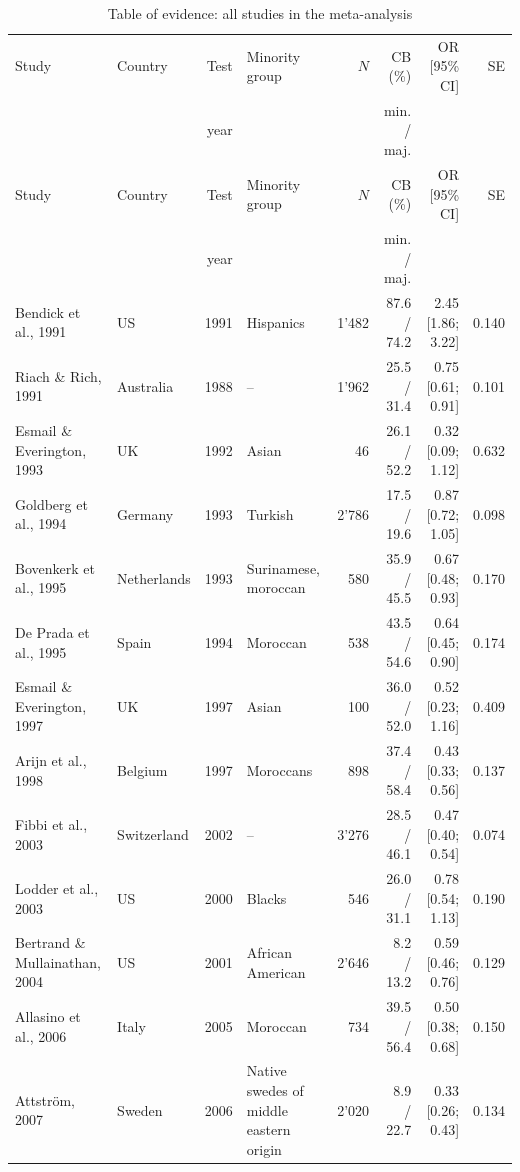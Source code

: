 {\scriptsize
\setlength{\tabcolsep}{3pt}
\begin{longtable}{>{\raggedright\arraybackslash}p{3.4cm}lr>{\raggedright\arraybackslash}p{3.2cm}rrrr}
\caption{Table of evidence: all studies in the meta-analysis}\label{tab:evidence}\\
\toprule
Study & Country & Test & Minority group & $N$ & CB (\%) & OR [95\% CI] & SE \\
 & & year & & & min. / maj. & & \\
\midrule\endfirsthead
\toprule
Study & Country & Test & Minority group & $N$ & CB (\%) & OR [95\% CI] & SE \\
 & & year & & & min. / maj. & & \\
\midrule\endhead
\bottomrule\endfoot
Bendick et al., 1991 & US & 1991 & Hispanics & 1'482 & 87.6 / 74.2 & 2.45 [1.86; 3.22] & 0.140 \\
Riach \& Rich, 1991 & Australia & 1988 & -- & 1'962 & 25.5 / 31.4 & 0.75 [0.61; 0.91] & 0.101 \\
Esmail \& Everington, 1993 & UK & 1992 & Asian & 46 & 26.1 / 52.2 & 0.32 [0.09; 1.12] & 0.632 \\
Goldberg et al., 1994 & Germany & 1993 & Turkish & 2'786 & 17.5 / 19.6 & 0.87 [0.72; 1.05] & 0.098 \\
Bovenkerk et al., 1995 & Netherlands & 1993 & Surinamese, moroccan & 580 & 35.9 / 45.5 & 0.67 [0.48; 0.93] & 0.170 \\
De Prada et al., 1995 & Spain & 1994 & Moroccan & 538 & 43.5 / 54.6 & 0.64 [0.45; 0.90] & 0.174 \\
Esmail \& Everington, 1997 & UK & 1997 & Asian & 100 & 36.0 / 52.0 & 0.52 [0.23; 1.16] & 0.409 \\
Arijn et al., 1998 & Belgium & 1997 & Moroccans & 898 & 37.4 / 58.4 & 0.43 [0.33; 0.56] & 0.137 \\
Fibbi et al., 2003 & Switzerland & 2002 & -- & 3'276 & 28.5 / 46.1 & 0.47 [0.40; 0.54] & 0.074 \\
Lodder et al., 2003 & US & 2000 & Blacks & 546 & 26.0 / 31.1 & 0.78 [0.54; 1.13] & 0.190 \\
Bertrand \& Mullainathan, 2004 & US & 2001 & African American & 2'646 & 8.2 / 13.2 & 0.59 [0.46; 0.76] & 0.129 \\
Allasino et al., 2006 & Italy & 2005 & Moroccan & 734 & 39.5 / 56.4 & 0.50 [0.38; 0.68] & 0.150 \\
Attström, 2007 & Sweden & 2006 & Native swedes of middle eastern origin & 2'020 & 8.9 / 22.7 & 0.33 [0.26; 0.43] & 0.134 \\

\end{longtable}}
